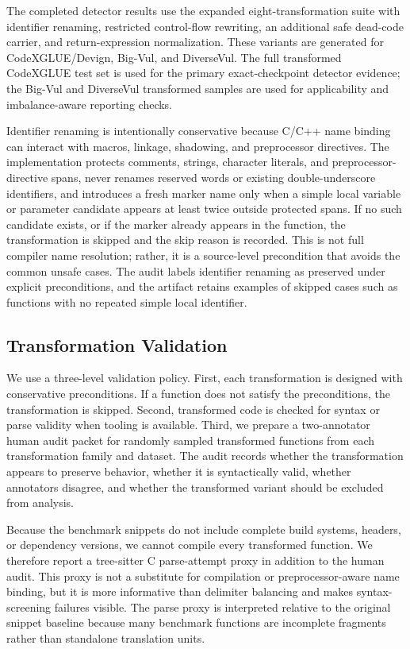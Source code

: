 \documentclass[a4paper,fleqn]{cas-dc}
\begin{document}
The completed detector results use the expanded eight-transformation suite with
identifier renaming, restricted control-flow rewriting, an additional safe
dead-code carrier, and return-expression normalization. These variants are
generated for CodeXGLUE/Devign, Big-Vul, and DiverseVul. The full transformed
CodeXGLUE test set is used for the primary exact-checkpoint detector evidence;
the Big-Vul and DiverseVul transformed samples are used for applicability and
imbalance-aware reporting checks.

Identifier renaming is intentionally conservative because C/C++ name binding
can interact with macros, linkage, shadowing, and preprocessor directives. The
implementation protects comments, strings, character literals, and
preprocessor-directive spans, never renames reserved words or existing
double-underscore identifiers, and introduces a fresh marker name only when a
simple local variable or parameter candidate appears at least twice outside
protected spans. If no such candidate exists, or if the marker already appears
in the function, the transformation is skipped and the skip reason is recorded.
This is not full compiler name resolution; rather, it is a source-level
precondition that avoids the common unsafe cases. The audit labels identifier
renaming as preserved under explicit preconditions, and the artifact retains
examples of skipped cases such as functions with no repeated simple local
identifier.

\subsection{Transformation Validation}

We use a three-level validation policy. First, each transformation is designed
with conservative preconditions. If a function does not satisfy the
preconditions, the transformation is skipped. Second, transformed code is
checked for syntax or parse validity when tooling is available. Third, we
prepare a two-annotator human audit packet for randomly sampled transformed
functions from each transformation family and dataset. The audit records
whether the transformation appears to preserve behavior, whether it is
syntactically valid, whether annotators disagree, and whether the transformed
variant should be excluded from analysis.

Because the benchmark snippets do not include complete build systems, headers,
or dependency versions, we cannot compile every transformed function. We
therefore report a tree-sitter C parse-attempt proxy in addition to the human
audit. This proxy is not a substitute for compilation or preprocessor-aware
name binding, but it is more informative than delimiter balancing and makes
syntax-screening failures visible. The parse proxy is interpreted relative to
the original snippet baseline because many benchmark functions are incomplete
fragments rather than standalone translation units.
\end{document}
